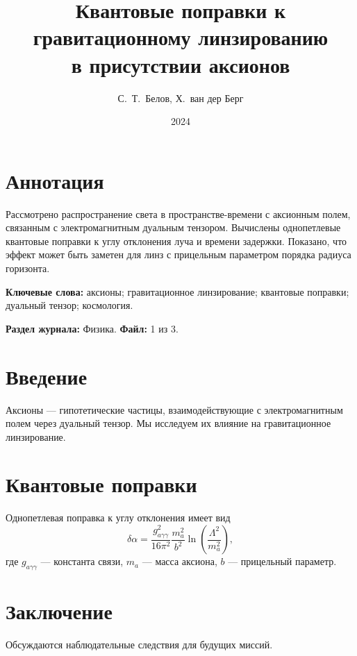\documentclass[12pt]{article}
\title{Квантовые поправки к гравитационному линзированию\\ в присутствии аксионов}
\author{С.~Т.~Белов, Х.~ван дер Берг}
\date{2024}
\begin{document}
\maketitle

\section*{Аннотация}
Рассмотрено распространение света в пространстве-времени с аксионным полем, связанным с электромагнитным дуальным тензором. Вычислены однопетлевые квантовые поправки к углу отклонения луча и времени задержки. Показано, что эффект может быть заметен для линз с прицельным параметром порядка радиуса горизонта.

\vspace{0.5cm}
\noindent\textbf{Ключевые слова:} аксионы; гравитационное линзирование; квантовые поправки; дуальный тензор; космология.

\vspace{0.3cm}
\noindent\textbf{Раздел журнала:} Физика. \quad \textbf{Файл:} 1 из 3.

\section{Введение}
Аксионы — гипотетические частицы, взаимодействующие с электромагнитным полем через дуальный тензор. Мы исследуем их влияние на гравитационное линзирование.

\section{Квантовые поправки}
Однопетлевая поправка к углу отклонения имеет вид
\begin{equation}
\delta \alpha = \frac{g_{a\gamma\gamma}^2}{16\pi^2} \frac{m_a^2}{b^2} \ln\left(\frac{\Lambda^2}{m_a^2}\right),
\end{equation}
где $g_{a\gamma\gamma}$ — константа связи, $m_a$ — масса аксиона, $b$ — прицельный параметр.

\section{Заключение}
Обсуждаются наблюдательные следствия для будущих миссий.
\end{document}
